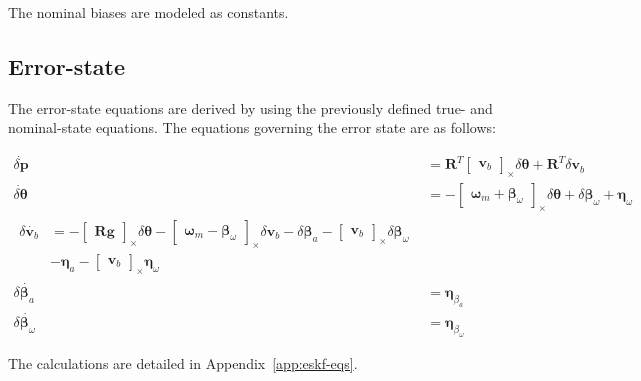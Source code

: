 The nominal biases are modeled as constants.

\subsection*{Error-state}

The error-state equations are derived by using the previously defined true- and nominal-state equations. The equations governing the error state are as follows:

\begin{subequations}
\begin{align}
    \dot{\delta \mathbf{p}}&=\mathbf{R}^T \begin{bmatrix}\mathbf{v}_b\end{bmatrix}_\times\delta\boldsymbol{\theta} + \mathbf{R}^T\delta \mathbf{v}_b \\
    \dot{\delta\boldsymbol{\theta}} &=-\begin{bmatrix}\boldsymbol{\omega}_m + \boldsymbol{\beta}_\omega\end{bmatrix}_\times\delta\boldsymbol{\theta} + \delta\boldsymbol{\beta}_\omega + \boldsymbol{\eta}_{\omega} \\
    \begin{split}
    \delta \dot{\mathbf{v}_b}&=-\begin{bmatrix}\mathbf{R}\mathbf{g}\end{bmatrix}_\times\delta\boldsymbol{\theta} -\begin{bmatrix}\boldsymbol{\omega}_m-\boldsymbol{\beta}_\omega\end{bmatrix}_\times\delta \mathbf{v}_b 
    -\delta\boldsymbol{\beta}_a-\begin{bmatrix}\mathbf{v}_b \end{bmatrix}_\times\delta\boldsymbol{\beta}_\omega \\ &
    -\boldsymbol{\eta}_{a}-\begin{bmatrix}\mathbf{v}_b \end{bmatrix}_\times\boldsymbol{\eta}_{\omega}
    \end{split} \\
    \delta\dot{\boldsymbol{\beta}_a}&=\boldsymbol{\eta}_{\beta_a} \\
    \delta\dot{\boldsymbol{\beta}_\omega}&=\boldsymbol{\eta}_{\beta_\omega}
\end{align}\label{eq:error-state}
\end{subequations}

The calculations are detailed in Appendix~\ref{app:eskf-eqs}.

